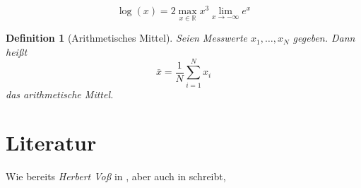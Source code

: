 \documentclass[
    fontsize=11pt,%
    paper=b5,%
    headings=small,
    parskip=half,
    listof=totoc,
    bibliography=totoc,
    pagesize
]{scrbook}
\theoremstyle{break}
\newtheorem{definition}{Definition}[chapter]
\theoremstyle{plain}
\newcommand{\autor}[1]{\textit{#1}} %
\begin{document}
\[
\log(x)=2\max_{x\in \mathbb{R}}x^3\lim_{x\to-\infty}e^x
\]

\begin{definition}[Arithmetisches Mittel]
    Seien Messwerte $x_1,\ldots,x_N$ gegeben. Dann heißt
    \begin{equation}
    \bar{x}=\frac{1}{N}\sum_{i=1}^{N}x_i
    \end{equation}
    das arithmetische Mittel.
\end{definition}

\section{Literatur}
Wie bereits \autor{Herbert Voß} in \cite[12--16]{Voss.2012}, aber auch in \cite[34]{Voss.2007} schreibt,

\cite{Mosgen.1998}

\cite{Mittelbach.2004}
\nocite{*}
\printbibliography
\end{document}
